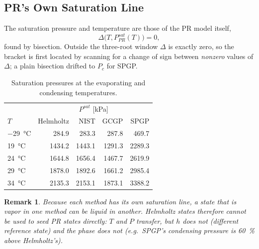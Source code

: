 \documentclass{article}
\newtheorem{remark}{Remark}
\begin{document}
\subsection{PR's Own Saturation Line}
The saturation pressure and temperature are those of the PR model itself,
\begin{equation}
\Delta\big(T, P^{sat}_{PR}(T)\big) = 0,
\end{equation}
found by bisection. Outside the three-root window $\Delta$ is exactly zero, so
the bracket is first located by scanning for a change of sign between
\emph{nonzero} values of $\Delta$; a plain bisection drifted to $P_c$ for SPGP.

\begin{table}[h]
\centering
\begin{tabular}{lrrrr}
\toprule
& \multicolumn{4}{c}{$P^{sat}$ [kPa]} \\
$T$ & Helmholtz & NIST & GCGP & SPGP \\
\midrule
\SI{-29}{\celsius} & 284.9 & 283.3 & 287.8 & 469.7 \\
\SI{19}{\celsius} & 1434.2 & 1443.1 & 1291.3 & 2289.3 \\
\SI{24}{\celsius} & 1644.8 & 1656.4 & 1467.7 & 2619.9 \\
\SI{29}{\celsius} & 1878.0 & 1892.6 & 1661.2 & 2985.4 \\
\SI{34}{\celsius} & 2135.3 & 2153.1 & 1873.1 & 3388.2 \\
\bottomrule
\end{tabular}
\caption{Saturation pressures at the evaporating and condensing temperatures.}
\end{table}

\begin{remark}
Because each method has its own saturation line, a state that is vapor in one
method can be liquid in another. Helmholtz states therefore cannot be used to
seed PR states directly: $T$ and $P$ transfer, but $h$ does not (different
reference state) and the phase does not (e.g.\ SPGP's condensing pressure is
\SI{60}{\percent} above Helmholtz's).
\end{remark}
\end{document}
